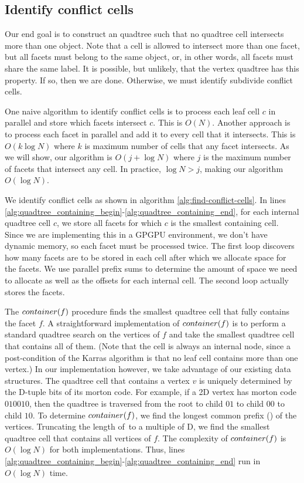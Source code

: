 \documentclass{egpubl}
\begin{document}
\subsection{Identify conflict cells}

Our end goal is to construct an quadtree such that no quadtree cell intersects more than one object. Note that a cell is allowed to intersect more than one facet, but all facets must belong to the same object, or, in other words, all facets must share the same label. It is possible, but unlikely, that the vertex quadtree has this property. If so, then we are done. Otherwise, we must identify subdivide conflict cells.

One naive algorithm to identify conflict cells is to process each leaf cell $c$ in parallel and store which facets intersect $c$. This is $O(N)$. Another approach is to process each facet in parallel and add it to every cell that it intersects. This is $O(k\log{N})$ where $k$ is maximum number of cells that any facet intersects. As we will show, our algorithm is $O(j + \log{N})$ where $j$ is the maximum number of facets that intersect any cell. In practice, $\log{N} > j$, making our algorithm $O(\log{N})$.

We identify conflict cells as shown in algorithm \ref{alg:find-conflict-cells}. In lines \ref{alg:quadtree_containing_begin}-\ref{alg:quadtree_containing_end}, for each internal quadtree cell $c$, we store all facets for which $c$ is the smallest containing cell. Since we are implementing this in a GPGPU environment, we don't have dynamic memory, so each facet must be processed twice. The first loop discovers how many facets are to be stored in each cell after which we allocate space for the facets. We use parallel prefix sums to determine the amount of space we need to allocate as well as the offsets for each internal cell. The second loop actually stores the facets.

The $container(f)$ procedure finds the smallest quadtree cell that fully contains the facet $f$. A straightforward implementation of $container(f)$ is to perform a standard quadtree search on the vertices of $f$ and take the smallest quadtree cell that contains all of them. (Note that the cell is always an internal node, since a post-condition of the Karras algorithm is that no leaf cell contains more than one vertex.) In our implementation however, we take advantage of our existing data structures. The quadtree cell that contains a vertex $v$ is uniquely determined by the D-tuple bits of its morton code. For example, if a 2D vertex has morton code $010010$, then the quadtree is traversed from the root to child $01$ to child $00$ to child $10$. To determine $container(f)$, we find the longest common prefix (\lcp) of the vertices. Truncating the length of \lcp\,to a multiple of D, we find the smallest quadtree cell that contains all vertices of $f$. The complexity of $container(f)$ is $O(\log{N})$ for both implementations. Thus, lines \ref{alg:quadtree_containing_begin}-\ref{alg:quadtree_containing_end} run in $O(\log{N})$ time.
\end{document}
